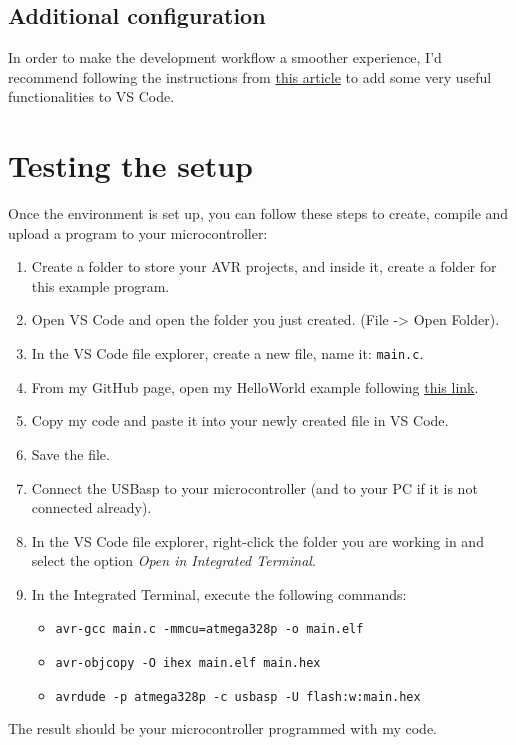 \documentclass[10pt,letterpaper]{article}
\begin{document}
\subsection{Additional configuration}
In order to make the development workflow a smoother experience, I'd recommend following the instructions from \href{https://www.tonymitchell.ca/posts/use-vscode-with-avr-toolchain/}{this article} to add some very useful functionalities to VS Code.

\section{Testing the setup}
Once the environment is set up, you can follow these steps to create, compile and upload a program to your microcontroller:
\begin{enumerate}
    \item Create a folder to store your AVR projects, and inside it, create a folder for this example program.
    \item Open VS Code and open the folder you just created. (File -> Open Folder).
    \item In the VS Code file explorer, create a new file, name it: {\color{ForestGreen}\texttt{main.c}}.
    \item From my GitHub page, open my HelloWorld example following \href{https://github.com/dagmtz/I7266/blob/master/001_Assets/004_Examples/mega328P/001_HelloWorld/main.c}{this link}.
    \item Copy my code and paste it into your newly created file in VS Code.
    \item Save the file.
    \item Connect the USBasp to your microcontroller (and to your PC if it is not connected already).
    \item In the VS Code file explorer, right-click the folder you are working in and select the option \textit{Open in Integrated Terminal}.
    \item In the Integrated Terminal, execute the following commands: 
    \begin{itemize}
        \item \texttt{avr-gcc main.c -mmcu=atmega328p -o main.elf}
        \item \texttt{avr-objcopy -O ihex main.elf main.hex}
        \item \texttt{avrdude -p atmega328p -c usbasp -U flash:w:main.hex}
    \end{itemize}
\end{enumerate}
The result should be your microcontroller programmed with my code.
\end{document}
